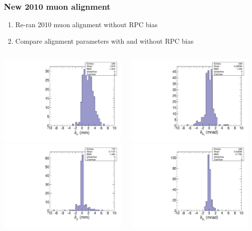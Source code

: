 \documentclass[compress]{beamer}
\begin{document}
\begin{frame}
\frametitle{New 2010 muon alignment}

\begin{enumerate}
\item Re-ran 2010 muon alignment without RPC bias
\item Compare alignment parameters with and without RPC bias
\end{enumerate}

\begin{columns}
\includegraphics[width=0.5\linewidth]{01_deltax_with_and_without_RPC.pdf}
\includegraphics[width=0.5\linewidth]{02_deltay_with_and_without_RPC.pdf}

\includegraphics[width=0.5\linewidth]{03_deltaphiy_with_and_without_RPC.pdf}
\includegraphics[width=0.5\linewidth]{04_deltaphiz_with_and_without_RPC.pdf}


\end{columns}
\end{frame}
\end{document}
